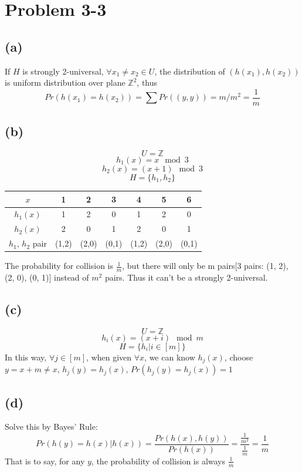 \documentclass{article}
\begin{document}
\section*{Problem 3-3}
  \subsection*{(a)}
    If $H$ is strongly 2-universal, $\forall x_1 \neq x_2 \in U$, the distribution of $(h(x_1), h(x_2))$ is uniform distribution over plane $\mathbb{Z}^2$, thus
    $$ Pr(h(x_1) = h(x_2)) = \sum Pr((y, y)) = m / m^2 = \frac{1}{m}$$
  \subsection*{(b)}
    $$ U = \mathbb{Z}$$
    $$h_1(x) = x \mod 3$$
    $$h_2(x) = (x+1) \mod 3$$
    $$H = \{h_1, h_2\}$$
    \begin{center}\begin{table}[!hbp]
    \begin{tabular}{|c|c|c|c|c|c|c|}
      \hline
      $x$ & 1 & 2 & 3 & 4 & 5 & 6 \\ 
      \hline
      $h_1(x)$ & 1 & 2 & 0 & 1 & 2 & 0 \\
      \hline
      $h_2(x)$ & 2 & 0 & 1 & 2 & 0 & 1 \\
      \hline
      $h_1$, $h_2$ pair & (1,2) & (2,0) & (0,1) & (1,2) & (2,0) & (0,1) \\
      \hline
    \end{tabular}
    \end{table}\end{center}
    The probability for collision is $\frac{1}{m}$, but there will only be m pairs[3 pairs: (1, 2), (2, 0), (0, 1)] instead of $m^2$ pairs. Thus it can't be a strongly 2-universal.
  \subsection*{(c)}
    $$ U = \mathbb{Z}$$
    $$h_i(x) = (x+i) \mod m$$
    $$H = \{h_i | i \in [m]\}$$
    In this way, $\forall j \in [m]$, when given  $\forall x$, we can know $h_j(x)$, choose $y = x + m \neq x$, $h_j(y) = h_j(x)$, $Pr(h_j(y) = h_j(x)) = 1$

  \subsection*{(d)}
    Solve this by Bayes' Rule:
    $$Pr(h(y) = h(x) | h(x)) = \frac{Pr(h(x), h(y))}{Pr(h(x))} = \frac{\frac{1}{m^2}}{\frac{1}{m}} = \frac{1}{m}$$
    That is to say, for any $y$, the probability of collision is always $\frac{1}{m}$
\end{document}
